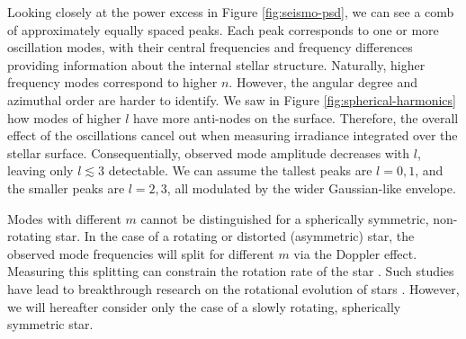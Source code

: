 Looking closely at the power excess in Figure \ref{fig:seismo-psd}, we can see a comb of approximately equally spaced peaks. Each peak corresponds to one or more oscillation modes, with their central frequencies and frequency differences providing information about the internal stellar structure. Naturally, higher frequency modes correspond to higher \(n\). However, the angular degree and azimuthal order are harder to identify. We saw in Figure \ref{fig:spherical-harmonics} how modes of higher \(l\) have more anti-nodes on the surface. Therefore, the overall effect of the oscillations cancel out when measuring irradiance integrated over the stellar surface. Consequentially, observed mode amplitude decreases with \(l\), leaving only \(l \lesssim 3\) detectable. 
We can assume the tallest peaks are \(l=0,1\), and the smaller peaks are \(l=2,3\), all modulated by the wider Gaussian-like envelope.

Modes with different \(m\) cannot be distinguished for a spherically symmetric, non-rotating star. In the case of a rotating or distorted (asymmetric) star, the observed mode frequencies will split for different \(m\) via the Doppler effect. Measuring this splitting can constrain the rotation rate of the star \citep[e.g.][]{Davies.Chaplin.ea2015,Garcia.Ceillier.ea2014,Deheuvels.Garcia.ea2012}. Such studies have lead to breakthrough research on the rotational evolution of stars \citep[e.g.][]{Angus.Aigrain.ea2015,Hall.Davies.ea2021,vanSaders.Ceillier.ea2016}. However, we will hereafter consider only the case of a slowly rotating, spherically symmetric star.

